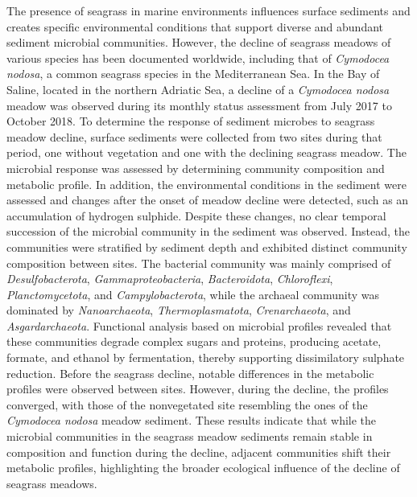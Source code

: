 \documentclass[
  12 pt,
]{book}
\begin{document}
{The presence of seagrass in marine environments influences surface sediments and creates specific environmental conditions that support diverse and abundant sediment microbial communities. However, the decline of seagrass meadows of various species has been documented worldwide, including that of \emph{Cymodocea nodosa}, a common seagrass species in the Mediterranean Sea. In the Bay of Saline, located in the northern Adriatic Sea, a decline of a \emph{Cymodocea nodosa} meadow was observed during its monthly status assessment from July 2017 to October 2018. To determine the response of sediment microbes to seagrass meadow decline, surface sediments were collected from two sites during that period, one without vegetation and one with the declining seagrass meadow. The microbial response was assessed by determining community composition and metabolic profile. In addition, the environmental conditions in the sediment were assessed and changes after the onset of meadow decline were detected, such as an accumulation of hydrogen sulphide. Despite these changes, no clear temporal succession of the microbial community in the sediment was observed. Instead, the communities were stratified by sediment depth and exhibited distinct community composition between sites. The bacterial community was mainly comprised of \emph{Desulfobacterota}, \emph{Gammaproteobacteria}, \emph{Bacteroidota}, \emph{Chloroflexi}, \emph{Planctomycetota}, and \emph{Campylobacterota}, while the archaeal community was dominated by \emph{Nanoarchaeota}, \emph{Thermoplasmatota}, \emph{Crenarchaeota}, and \emph{Asgardarchaeota}. Functional analysis based on microbial profiles revealed that these communities degrade complex sugars and proteins, producing acetate, formate, and ethanol by fermentation, thereby supporting dissimilatory sulphate reduction. Before the seagrass decline, notable differences in the metabolic profiles were observed between sites. However, during the decline, the profiles converged, with those of the nonvegetated site resembling the ones of the \emph{Cymodocea nodosa} meadow sediment. These results indicate that while the microbial communities in the seagrass meadow sediments remain stable in composition and function during the decline, adjacent communities shift their metabolic profiles, highlighting the broader ecological influence of the decline of seagrass meadows.

    {
    
        \setlength{\parindent}{0pt}
        
}}
\end{document}
